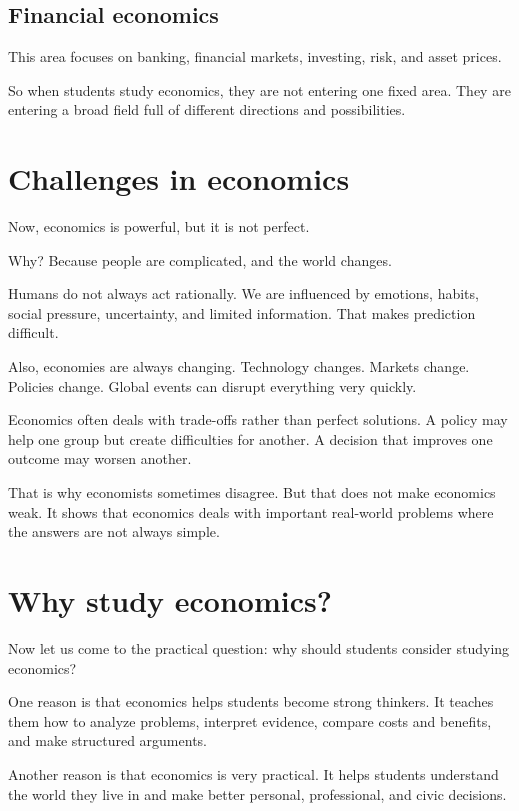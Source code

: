 \documentclass[12pt]{article}
\begin{document}
\subsection*{Financial economics}

This area focuses on banking, financial markets, investing, risk, and asset prices.

So when students study economics, they are not entering one fixed area. They are entering a broad field full of different directions and possibilities.

\section*{Challenges in economics}

Now, economics is powerful, but it is not perfect.

Why? Because people are complicated, and the world changes.

Humans do not always act rationally. We are influenced by emotions, habits, social pressure, uncertainty, and limited information. That makes prediction difficult.

Also, economies are always changing. Technology changes. Markets change. Policies change. Global events can disrupt everything very quickly.

Economics often deals with trade-offs rather than perfect solutions. A policy may help one group but create difficulties for another. A decision that improves one outcome may worsen another.

That is why economists sometimes disagree. But that does not make economics weak. It shows that economics deals with important real-world problems where the answers are not always simple.

\section*{Why study economics?}

Now let us come to the practical question: why should students consider studying economics?

One reason is that economics helps students become strong thinkers. It teaches them how to analyze problems, interpret evidence, compare costs and benefits, and make structured arguments.

Another reason is that economics is very practical. It helps students understand the world they live in and make better personal, professional, and civic decisions.
\end{document}
